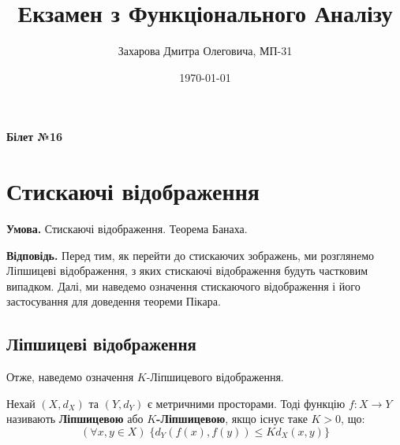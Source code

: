 \documentclass[14pt]{extarticle}
\title{\huge\sffamily\bfseries Екзамен з Функціонального Аналізу}
\author{\Large\sffamily Захарова Дмитра Олеговича, МП-31}
\date{\sffamily \today}
\newcommand{\<}{\langle}
\renewcommand{\>}{\rangle}
\theoremstyle{mystyle}{\newtheorem{definition}{Definition}[section]}
\theoremstyle{mystyle}{\newtheorem{proposition}[definition]{Proposition}}
\theoremstyle{mystyle}{\newtheorem{theorem}[definition]{Theorem}}
\theoremstyle{mystyle}{\newtheorem{lemma}[definition]{Lemma}}
\theoremstyle{mystyle}{\newtheorem{corollary}[definition]{Corollary}}
\theoremstyle{mystyle}{\newtheorem*{remark}{Remark}}
\theoremstyle{mystyle}{\newtheorem*{remarks}{Remarks}}
\theoremstyle{mystyle}{\newtheorem*{example}{Example}}
\theoremstyle{mystyle}{\newtheorem*{examples}{Examples}}
\theoremstyle{definition}{\newtheorem*{exercise}{Exercise}}
\theoremstyle{cstyle}{\newtheorem*{cthm}{}}
\theoremstyle{warn}
\begin{document}
\maketitle

\begin{center}
    \textbf{Білет №16}
\end{center}


\begin{tcolorbox}[title=Вміст, fonttitle=\sffamily\bfseries\selectfont,interior style={left color=contcol1!40!white,right color=contcol2!40!white},frame style={left color=contcol1!80!white,right color=contcol2!80!white},coltitle=black,top=2mm,bottom=2mm,left=2mm,right=2mm,drop fuzzy shadow,enhanced,breakable]
\makeatletter
{}
\makeatother
\end{tcolorbox}

\newpage

\section{Стискаючі відображення}

\textbf{Умова.} Стискаючі відображення. Теорема Банаха.

\textbf{Відповідь.} Перед тим, як перейти до стискаючих зображень, ми розглянемо Ліпшицеві відображення, з яких стискаючі відображення будуть частковим випадком. Далі, ми наведемо означення стискаючого відображення і його застосування для доведення теореми Пікара.

\subsection{Ліпшицеві відображення}

Отже, наведемо означення $K$-Ліпшицевого відображення.

\begin{definition}
    Нехай $(X,d_X)$ та $(Y,d_Y)$ є метричними просторами. Тоді функцію $f: X \to Y$ називають \textbf{Ліпшицевою} або \textbf{$K$-Ліпшицевою}, якщо існує таке $K>0$, що:
    \begin{equation}
        (\forall x,y \in X) \; \{d_Y(f(x),f(y)) \leq K d_X(x,y)\}
    \end{equation}
\end{definition}
\end{document}
